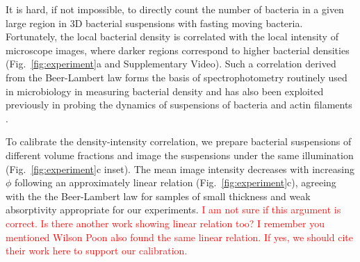 \documentclass[twocolumn,aps,prl,amsmath,amssymb,longbibliography]{revtex4-2}
\begin{document}
It is hard, if not impossible, to directly count the number of bacteria in a given large region in 3D bacterial suspensions with fasting moving bacteria. Fortunately, the local bacterial density is correlated with the local intensity of microscope images, where darker regions correspond to higher bacterial densities (Fig.~\ref{fig:experiment}a and Supplementary Video). Such a correlation derived from the Beer-Lambert law forms the basis of spectrophotometry routinely used in microbiology in measuring bacterial density \cite{Tortora2018} and has also been exploited previously in probing the dynamics of suspensions of bacteria and actin filaments \cite{Sokolov2009, Wilson2011, Schaller2013}.


To calibrate the density-intensity correlation, we prepare bacterial suspensions of different volume fractions and image the suspensions under the same illumination (Fig.~\ref{fig:experiment}c inset). The mean image intensity decreases with increasing $\phi$ following an approximately linear relation (Fig.~\ref{fig:experiment}c), agreeing with the the Beer-Lambert law for samples of small thickness and weak absorptivity appropriate for our experiments. \textcolor{red}{I am not sure if this argument is correct. Is there another work showing linear relation too? I remember you mentioned Wilson Poon also found the same linear relation. If yes, we should cite their work here to support our calibration.}
\end{document}

